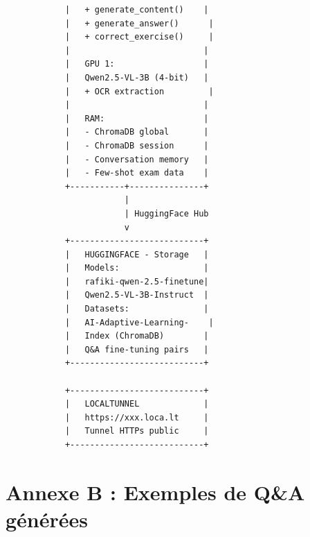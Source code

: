 \documentclass[12pt,a4paper]{report}
\begin{document}
\begin{verbatim}
            |   + generate_content()    |                            
            |   + generate_answer()      |                            
            |   + correct_exercise()     |                            
            |                           |                            
            |   GPU 1:                  |                            
            |   Qwen2.5-VL-3B (4-bit)   |                            
            |   + OCR extraction         |                            
            |                           |                            
            |   RAM:                    |                            
            |   - ChromaDB global       |                            
            |   - ChromaDB session      |                            
            |   - Conversation memory   |                            
            |   - Few-shot exam data    |                            
            +-----------+---------------+                            
                        |                                            
                        | HuggingFace Hub                            
                        v                                            
            +---------------------------+                            
            |   HUGGINGFACE - Storage   |                            
            |   Models:                 |                            
            |   rafiki-qwen-2.5-finetune|                            
            |   Qwen2.5-VL-3B-Instruct  |                            
            |   Datasets:               |                            
            |   AI-Adaptive-Learning-    |                            
            |   Index (ChromaDB)        |                            
            |   Q&A fine-tuning pairs   |                            
            +---------------------------+                            
                                                                       
            +---------------------------+                            
            |   LOCALTUNNEL             |                            
            |   https://xxx.loca.lt     |                            
            |   Tunnel HTTPs public     |                            
            +---------------------------+                            
\end{verbatim}

\section{Annexe B : Exemples de Q\&A générées}
\end{document}
